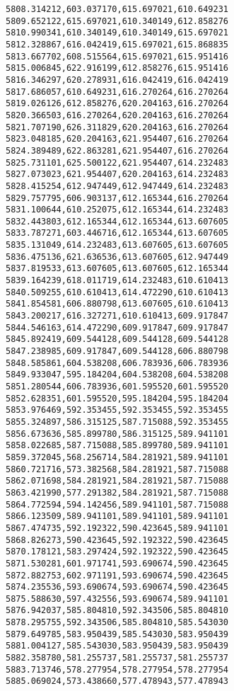 \documentclass[11pt]{article}
\begin{document}
\begin{Verbatim}[commandchars=\\\{\}]
5808.314212,603.037170,615.697021,610.649231
5809.652122,615.697021,610.340149,612.858276
5810.990341,610.340149,610.340149,615.697021
5812.328867,616.042419,615.697021,615.868835
5813.667702,608.515564,615.697021,615.951416
5815.006845,622.916199,612.858276,615.951416
5816.346297,620.278931,616.042419,616.042419
5817.686057,610.649231,616.270264,616.270264
5819.026126,612.858276,620.204163,616.270264
5820.366503,616.270264,620.204163,616.270264
5821.707190,626.311829,620.204163,616.270264
5823.048185,620.204163,621.954407,616.270264
5824.389489,622.863281,621.954407,616.270264
5825.731101,625.500122,621.954407,614.232483
5827.073023,621.954407,620.204163,614.232483
5828.415254,612.947449,612.947449,614.232483
5829.757795,606.903137,612.165344,616.270264
5831.100644,610.252075,612.165344,614.232483
5832.443803,612.165344,612.165344,613.607605
5833.787271,603.446716,612.165344,613.607605
5835.131049,614.232483,613.607605,613.607605
5836.475136,621.636536,613.607605,612.947449
5837.819533,613.607605,613.607605,612.165344
5839.164239,618.011719,614.232483,610.610413
5840.509255,610.610413,614.472290,610.610413
5841.854581,606.880798,613.607605,610.610413
5843.200217,616.327271,610.610413,609.917847
5844.546163,614.472290,609.917847,609.917847
5845.892419,609.544128,609.544128,609.544128
5847.238985,609.917847,609.544128,606.880798
5848.585861,604.538208,606.783936,606.783936
5849.933047,595.184204,604.538208,604.538208
5851.280544,606.783936,601.595520,601.595520
5852.628351,601.595520,595.184204,595.184204
5853.976469,592.353455,592.353455,592.353455
5855.324897,586.315125,587.715088,592.353455
5856.673636,585.899780,586.315125,589.941101
5858.022685,587.715088,585.899780,589.941101
5859.372045,568.256714,584.281921,589.941101
5860.721716,573.382568,584.281921,587.715088
5862.071698,584.281921,584.281921,587.715088
5863.421990,577.291382,584.281921,587.715088
5864.772594,594.142456,589.941101,587.715088
5866.123509,589.941101,589.941101,589.941101
5867.474735,592.192322,590.423645,589.941101
5868.826273,590.423645,592.192322,590.423645
5870.178121,583.297424,592.192322,590.423645
5871.530281,601.971741,593.690674,590.423645
5872.882753,602.971191,593.690674,590.423645
5874.235536,593.690674,593.690674,590.423645
5875.588630,597.432556,593.690674,589.941101
5876.942037,585.804810,592.343506,585.804810
5878.295755,592.343506,585.804810,585.543030
5879.649785,583.950439,585.543030,583.950439
5881.004127,585.543030,583.950439,583.950439
5882.358780,581.255737,581.255737,581.255737
5883.713746,578.277954,578.277954,578.277954
5885.069024,573.438660,577.478943,577.478943

\end{Verbatim}
\end{document}

